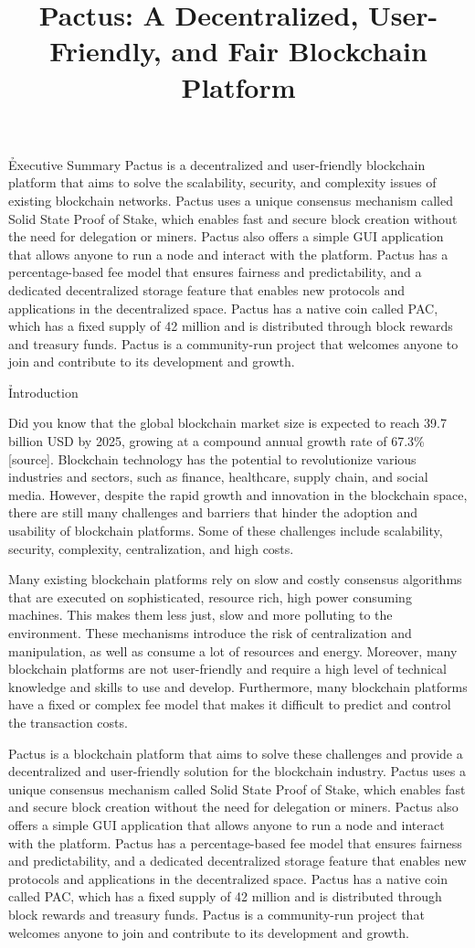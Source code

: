 \documentclass{novel}
\title     {Pactus: A Decentralized, User-Friendly, and Fair Blockchain Platform}
\begin{document}
\toc
\h {Executive Summary}
Pactus is a decentralized and user-friendly blockchain platform that aims to solve the scalability, security, and complexity issues of existing blockchain networks. Pactus uses a unique consensus mechanism called Solid State Proof of Stake, which enables fast and secure block creation without the need for delegation or miners. Pactus also offers a simple GUI application that allows anyone to run a node and interact with the platform. Pactus has a percentage-based fee model that ensures fairness and predictability, and a dedicated decentralized storage feature that enables new protocols and applications in the decentralized space. Pactus has a native coin called PAC, which has a fixed supply of 42 million and is distributed through block rewards and treasury funds. Pactus is a community-run project that welcomes anyone to join and contribute to its development and growth.

\h{Introduction}

Did you know that the global blockchain market size is expected to reach 39.7 billion USD by 2025, growing at a compound annual growth rate of 67.3\% [source]. Blockchain technology has the potential to revolutionize various industries and sectors, such as finance, healthcare, supply chain, and social media. However, despite the rapid growth and innovation in the blockchain space, there are still many challenges and barriers that hinder the adoption and usability of blockchain platforms. Some of these challenges include scalability, security, complexity, centralization, and high costs.

Many existing blockchain platforms rely on slow and costly consensus algorithms that are executed on sophisticated, resource rich, high power consuming machines. This makes them less just, slow and more polluting to the environment. These mechanisms introduce the risk of centralization and manipulation, as well as consume a lot of resources and energy. Moreover, many blockchain platforms are not user-friendly and require a high level of technical knowledge and skills to use and develop. Furthermore, many blockchain platforms have a fixed or complex fee model that makes it difficult to predict and control the transaction costs.

Pactus is a blockchain platform that aims to solve these challenges and provide a decentralized and user-friendly solution for the blockchain industry. Pactus uses a unique consensus mechanism called Solid State Proof of Stake, which enables fast and secure block creation without the need for delegation or miners. Pactus also offers a simple GUI application that allows anyone to run a node and interact with the platform. Pactus has a percentage-based fee model that ensures fairness and predictability, and a dedicated decentralized storage feature that enables new protocols and applications in the decentralized space. Pactus has a native coin called PAC, which has a fixed supply of 42 million and is distributed through block rewards and treasury funds. Pactus is a community-run project that welcomes anyone to join and contribute to its development and growth.
\end{document}
